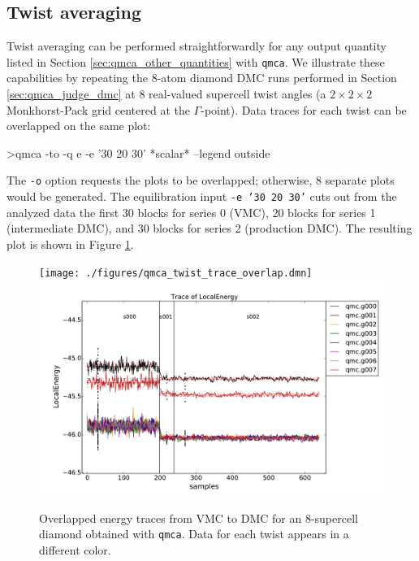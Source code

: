 \subsection{Twist averaging}
\label{sec:qmca_twist_average}
Twist averaging can be performed straightforwardly for any 
output quantity listed in Section \ref{sec:qmca_other_quantities} 
with \texttt{qmca}.  We illustrate these capabilities by 
repeating the 8-atom diamond DMC runs performed in Section 
\ref{sec:qmca_judge_dmc} at 8 real-valued supercell twist 
angles (a $2\times 2\times 2$ Monkhorst-Pack grid centered at 
the $\Gamma$-point).  Data traces for each twist can be overlapped 
on the same plot:
\begin{shade}
>qmca -to -q e -e '30 20 30' *scalar* --legend outside
\end{shade}
\noindent
The \texttt{-o} option requests the plots to be overlapped; otherwise,
8 separate plots would be generated.  The 
equilibration input \texttt{-e '30 20 30'} cuts out from 
the analyzed data the first 30 blocks for series 0 (VMC), 
20 blocks for series 1 (intermediate DMC), and 30 blocks for 
series 2 (production DMC).  The resulting plot is shown in 
Figure \ref{fig:qmca_twist_overlap}.

\begin{figure}
\begin{center}
\ifdefined\HCode
\texttt{[image: ./figures/qmca\_twist\_trace\_overlap.dmn]}
\else
\includegraphics[trim = 0mm 0mm 0mm 0mm, clip,width=0.9\columnwidth]{./figures/qmca_twist_trace_overlap.pdf}
\fi
\end{center}
\caption{Overlapped energy traces from VMC to DMC for an 8-supercell diamond obtained with \texttt{qmca}.  Data for each twist appears in a different color.}
\label{fig:qmca_twist_overlap}
\end{figure}


